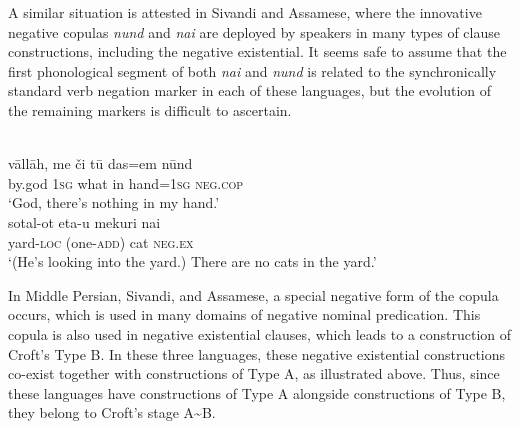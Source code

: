 ﻿\documentclass[output=paper]{langsci/langscibook}
\begin{document}
A similar situation is attested in Sivandi and Assamese, where the innovative negative copulas \textit{nund} and \textit{nai} are deployed by speakers in many types of clause constructions, including the negative existential. It seems safe to assume that the first phonological segment of both \textit{nai} and \textit{nund} is related to the synchronically standard verb negation marker in each of these languages, but the evolution of the remaining markers is difficult to ascertain. 
%
\begin{exe}\ex\label{ex:ieur-sivandi-nothing-in-hand}
\\
    \gll vāllāh, me    či      tū  das=em      nūnd \\
by.god  \textsc{1sg}  what  in  hand=\textsc{1sg}  \textsc{neg.cop} \\
    \glt `God, there's nothing in my hand.'
\ex\label{ex:ieur-assamese-nocats}
\\
    \gll sotal-ot    {\op}eta-u{\cp}      mekuri nai \\
yard-\textsc{loc} (one-\textsc{add}) cat \textsc{neg.ex} \\
    \glt `(He's looking into the yard.) There are no cats in the yard.'
    \end{exe}

In Middle Persian, Sivandi, and
Assamese, a special negative form of the copula occurs, which is used in many domains of negative nominal predication. This copula is also used in negative existential clauses, which leads to a construction of Croft's Type B. In these three languages, these negative existential constructions co-exist together with constructions of Type A, as illustrated above. Thus, since these languages have constructions of Type A alongside constructions of Type B, they belong to Croft's stage A{\textasciitilde}B. 
\end{document}
